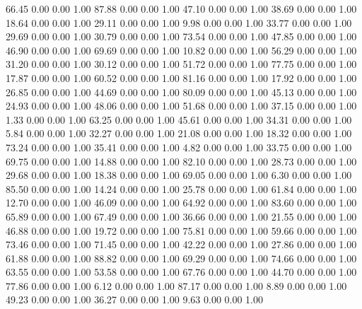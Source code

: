    66.45   0.00   0.00   1.00
   87.88   0.00   0.00   1.00
   47.10   0.00   0.00   1.00
   38.69   0.00   0.00   1.00
   18.64   0.00   0.00   1.00
   29.11   0.00   0.00   1.00
    9.98   0.00   0.00   1.00
   33.77   0.00   0.00   1.00
   29.69   0.00   0.00   1.00
   30.79   0.00   0.00   1.00
   73.54   0.00   0.00   1.00
   47.85   0.00   0.00   1.00
   46.90   0.00   0.00   1.00
   69.69   0.00   0.00   1.00
   10.82   0.00   0.00   1.00
   56.29   0.00   0.00   1.00
   31.20   0.00   0.00   1.00
   30.12   0.00   0.00   1.00
   51.72   0.00   0.00   1.00
   77.75   0.00   0.00   1.00
   17.87   0.00   0.00   1.00
   60.52   0.00   0.00   1.00
   81.16   0.00   0.00   1.00
   17.92   0.00   0.00   1.00
   26.85   0.00   0.00   1.00
   44.69   0.00   0.00   1.00
   80.09   0.00   0.00   1.00
   45.13   0.00   0.00   1.00
   24.93   0.00   0.00   1.00
   48.06   0.00   0.00   1.00
   51.68   0.00   0.00   1.00
   37.15   0.00   0.00   1.00
    1.33   0.00   0.00   1.00
   63.25   0.00   0.00   1.00
   45.61   0.00   0.00   1.00
   34.31   0.00   0.00   1.00
    5.84   0.00   0.00   1.00
   32.27   0.00   0.00   1.00
   21.08   0.00   0.00   1.00
   18.32   0.00   0.00   1.00
   73.24   0.00   0.00   1.00
   35.41   0.00   0.00   1.00
    4.82   0.00   0.00   1.00
   33.75   0.00   0.00   1.00
   69.75   0.00   0.00   1.00
   14.88   0.00   0.00   1.00
   82.10   0.00   0.00   1.00
   28.73   0.00   0.00   1.00
   29.68   0.00   0.00   1.00
   18.38   0.00   0.00   1.00
   69.05   0.00   0.00   1.00
    6.30   0.00   0.00   1.00
   85.50   0.00   0.00   1.00
   14.24   0.00   0.00   1.00
   25.78   0.00   0.00   1.00
   61.84   0.00   0.00   1.00
   12.70   0.00   0.00   1.00
   46.09   0.00   0.00   1.00
   64.92   0.00   0.00   1.00
   83.60   0.00   0.00   1.00
   65.89   0.00   0.00   1.00
   67.49   0.00   0.00   1.00
   36.66   0.00   0.00   1.00
   21.55   0.00   0.00   1.00
   46.88   0.00   0.00   1.00
   19.72   0.00   0.00   1.00
   75.81   0.00   0.00   1.00
   59.66   0.00   0.00   1.00
   73.46   0.00   0.00   1.00
   71.45   0.00   0.00   1.00
   42.22   0.00   0.00   1.00
   27.86   0.00   0.00   1.00
   61.88   0.00   0.00   1.00
   88.82   0.00   0.00   1.00
   69.29   0.00   0.00   1.00
   74.66   0.00   0.00   1.00
   63.55   0.00   0.00   1.00
   53.58   0.00   0.00   1.00
   67.76   0.00   0.00   1.00
   44.70   0.00   0.00   1.00
   77.86   0.00   0.00   1.00
    6.12   0.00   0.00   1.00
   87.17   0.00   0.00   1.00
    8.89   0.00   0.00   1.00
   49.23   0.00   0.00   1.00
   36.27   0.00   0.00   1.00
    9.63   0.00   0.00   1.00
